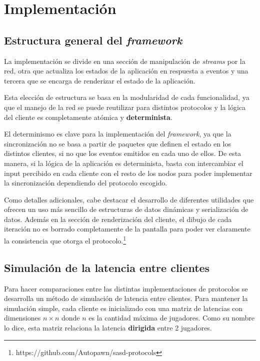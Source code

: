 \section{Implementación}


\subsection{Estructura general del \emph{framework}}

La implementación se divide en una sección de manipulación de \emph{streams} por la red, otra que actualiza los estados de la aplicación en respuesta a eventos y una tercera que se encarga de renderizar el estado de la aplicación.

Esta elección de estructura se basa en la modularidad de cada funcionalidad, ya que el manejo de la red se puede reutilizar para distintos protocolos y la lógica del cliente es completamente atómica y \textbf{determinista}.

El determinismo es clave para la implementación del \emph{framework}, ya que la sincronización no se basa a partir de paquetes que definen el estado en los distintos clientes, si no que los eventos emitidos en cada uno de ellos. De esta manera, si la lógica de la aplicación es determinista, basta con intercambiar el input percibido en cada cliente con el resto de los nodos para poder implementar la sincronización dependiendo del protocolo escogido.

Como detalles adicionales, cabe destacar el desarrollo de diferentes utilidades que ofrecen un uso más sencillo de estructuras de datos dinámicas y serialización de datos. Además en la sección de renderización del cliente, el dibujo de cada iteración no es borrado completamente de la pantalla para poder ver claramente la consistencia que otorga el protocolo.\footnote{https://github.com/Autopawn/sasd-protocols}

\subsection{Simulación de la latencia entre clientes}

Para hacer comparaciones entre las distintas implementaciones de protocolos se desarrolla un método de simulación de latencia entre clientes. Para mantener la simulación simple, cada cliente es inicializado con una matriz de latencias con dimensiones $n\times n$ donde $n$ es la cantidad máxima de jugadores. Como su nombre lo dice, esta matriz relaciona la latencia \textbf{dirigida} entre 2 jugadores.

